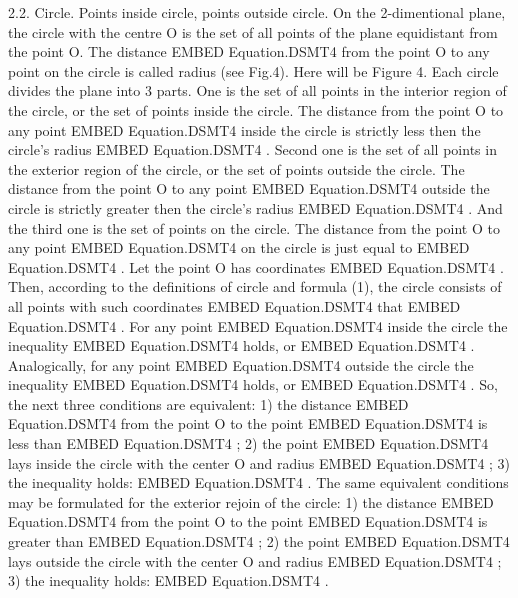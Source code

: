 \documentclass{article}
\begin{document}
2.2. Circle. Points inside circle, points outside circle.
On the 2-dimentional plane, the circle with the centre O is the set of all points of the plane equidistant from the point O.
The distance  EMBED Equation.DSMT4   from the point O to any point on the circle is called radius (see Fig.4).
Here will be Figure 4.
Each circle divides the plane into 3 parts.
One is the set of all points in the interior region of the circle, or the set of points inside the circle.
The distance from the point O to any point  EMBED Equation.DSMT4   inside the circle is strictly less then the circle’s radius  EMBED Equation.DSMT4  .
Second one is the set of all points in the exterior region of the circle, or the set of points outside the circle.
The distance from the point O to any point  EMBED Equation.DSMT4   outside the circle is strictly greater then the circle’s radius  EMBED Equation.DSMT4  .
And the third one is the set of points on the circle.
The distance from the point O to any point  EMBED Equation.DSMT4   on the circle is just equal to  EMBED Equation.DSMT4  .
Let the point O has coordinates  EMBED Equation.DSMT4  .
Then, according to the definitions of circle and formula (1), the circle consists of all points with such coordinates  EMBED Equation.DSMT4   that
 EMBED Equation.DSMT4  .
For any point  EMBED Equation.DSMT4   inside the circle the inequality  EMBED Equation.DSMT4   holds, or
 EMBED Equation.DSMT4  .
Analogically, for any point  EMBED Equation.DSMT4   outside the circle the inequality  EMBED Equation.DSMT4   holds, or
 EMBED Equation.DSMT4  .
So, the next three conditions are equivalent:
1) the distance  EMBED Equation.DSMT4   from the point O to the point  EMBED Equation.DSMT4   is less than  EMBED Equation.DSMT4  ;
2) the point  EMBED Equation.DSMT4   lays inside the circle with the center O and radius  EMBED Equation.DSMT4  ;
3) the inequality holds:
 EMBED Equation.DSMT4  .
The same equivalent conditions may be formulated for the exterior rejoin of the circle:
1) the distance  EMBED Equation.DSMT4   from the point O to the point  EMBED Equation.DSMT4   is greater than  EMBED Equation.DSMT4  ;
2) the point  EMBED Equation.DSMT4   lays outside the circle with the center O and radius  EMBED Equation.DSMT4  ;
3) the inequality holds:
 EMBED Equation.DSMT4  .
\end{document}
